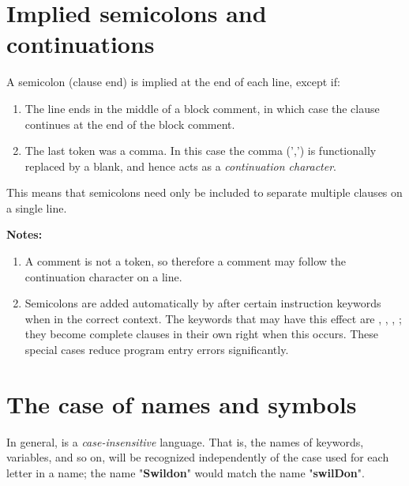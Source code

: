 \section{Implied semicolons and continuations}\label{refsemis}
 A semicolon (clause end) is implied at the end of each line, except
if:
\begin{enumerate}
\item The line ends in the middle of a block comment, in which case the
clause continues at the end of the block comment.
\item The last token was a comma.
In this case the comma (',') is functionally replaced by a blank, and hence
acts as a \emph{continuation character}.
\end{enumerate}
 This means that semicolons need only be included to separate
multiple clauses on a single line.
\begin{shaded}\noindent
\textbf{Notes:}
\begin{enumerate}
\item A comment is not a token, so therefore a comment may follow the
continuation character on a line.
\item Semicolons are added automatically by \crexx{} after certain
instruction keywords when in the correct context.
The keywords that may have this effect are ,
, , ; they become
complete clauses in their own right when this occurs.
These special cases reduce program entry errors significantly.
\end{enumerate}
\end{shaded}\indent
\section{The case of names and symbols}\label{refcase}
 
In general, \crexx{} is a \emph{case-insensitive} language.
That is, the names of keywords, variables, and so on, will be recognized
independently of the case used for each letter in a name; the name
"\textbf{Swildon}" would match the name
"\textbf{swilDon}".
 
